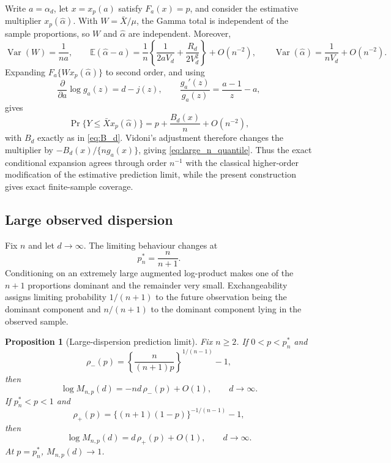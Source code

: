 \documentclass[11pt]{article}
\newtheorem{proposition}[theorem]{Proposition}
\theoremstyle{remark}
\newcommand{\E}{\mathbb E}
\begin{document}
Write $a=\alpha_d$, let $x=x_p(a)$ satisfy $F_a(x)=p$, and consider the estimative multiplier $x_p(\widehat\alpha)$. With $W=\bar X/\mu$, the Gamma total is independent of the sample proportions, so $W$ and $\widehat\alpha$ are independent. Moreover,
\[
 \operatorname{Var}(W)=\frac1{na},\qquad
 \E(\widehat\alpha-a)
 =\frac1n\left\{\frac1{2aV_d}+\frac{R_d}{2V_d^2}\right\}+O(n^{-2}),\qquad
 \operatorname{Var}(\widehat\alpha)=\frac1{nV_d}+O(n^{-2}).
\]
Expanding $F_a\{W x_p(\widehat\alpha)\}$ to second order, and using
\[
 \frac{\partial}{\partial a}\log g_a(z)=d-j(z),
 \qquad
 \frac{g_a'(z)}{g_a(z)}=\frac{a-1}{z}-a,
\]
gives
\begin{equation}
 \Pr\{Y\le \bar X x_p(\widehat\alpha)\}
 =p+\frac{B_d(x)}{n}+O(n^{-2}),
 \label{eq:estimative_coverage_error}
\end{equation}
with $B_d$ exactly as in \eqref{eq:B_d}. Vidoni's adjustment therefore changes the multiplier by $-B_d(x)/\{n g_a(x)\}$, giving \eqref{eq:large_n_quantile}. Thus the exact conditional expansion agrees through order $n^{-1}$ with the classical higher-order modification of the estimative prediction limit, while the present construction gives exact finite-sample coverage.

\subsection{Large observed dispersion}

Fix $n$ and let $d\to\infty$. The limiting behaviour changes at
\begin{equation}
 p_n^*=\frac{n}{n+1}.
 \label{eq:pstar}
\end{equation}
Conditioning on an extremely large augmented log-product makes one of the $n+1$ proportions dominant and the remainder very small. Exchangeability assigns limiting probability $1/(n+1)$ to the future observation being the dominant component and $n/(n+1)$ to the dominant component lying in the observed sample.

\begin{proposition}[Large-dispersion prediction limit]
\label{prop:large_d}
Fix $n\ge2$. If $0<p<p_n^*$ and
\begin{equation}
 \rho_-(p)=\left\{\frac{n}{(n+1)p}\right\}^{1/(n-1)}-1,
 \label{eq:rho_minus}
\end{equation}
then
\begin{equation}
 \log M_{n,p}(d)
 =-nd\,\rho_-(p)+O(1),
 \qquad d\to\infty.
 \label{eq:large_d_lowerbranch}
\end{equation}
If $p_n^*<p<1$ and
\begin{equation}
 \rho_+(p)=\{(n+1)(1-p)\}^{-1/(n-1)}-1,
 \label{eq:rho_plus}
\end{equation}
then
\begin{equation}
 \log M_{n,p}(d)
 =d\,\rho_+(p)+O(1),
 \qquad d\to\infty.
 \label{eq:large_d_upperbranch}
\end{equation}
At $p=p_n^*$, $M_{n,p}(d)\to1$.
\end{proposition}
\end{document}
